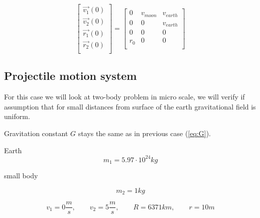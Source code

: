 \documentclass[english,12pt,a4paper, notitlepage]{report}
\begin{document}
	\begin{equation}
		\begin{bmatrix}
			\vec{v_1}(0)\\
			\vec{v_2}(0)\\
			\vec{r_1}(0)\\
			\vec{r_2}(0)\\
		\end{bmatrix}
		=
		\begin{bmatrix}
			0 & v_{moon} & v_{earth}\\
			0 & 0 & v_{earth}\\
			0 & 0 & 0\\
			r_0 & 0 & 0\\
		\end{bmatrix}
	\end{equation}
	
	\subsection{Projectile motion system}
	
	For this case we will look at two-body problem in micro scale, we will verify if assumption that for small distances from surface of the earth gravitational field is uniform.
	
	\noindent Gravitation constant $G$ stays the same as in previous case (\ref{eq:G}). 
	
	Earth
	$$ m_1 = 5.97 \cdot 10^{24} kg $$
	
	
	small body
	
	$$ m_2 = 1 kg$$
		
	$$
	v_{1} = 0 \frac{m}{s}
	, \qquad v_{2} = 5 \frac{m}{s}
	, \qquad R = 6371 km
	, \qquad  r = 10 m
	$$
		
\end{document}
